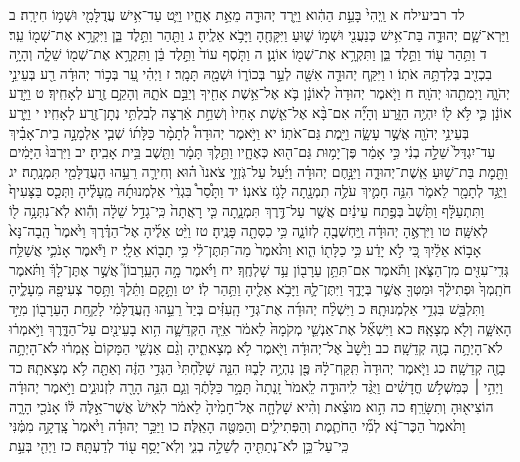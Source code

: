 \documentclass[twoside, openany, parskip=half, 11pt]{book}
\begin{document}
לד רביעילח א וַֽיְהִי֙ בָּעֵ֣ת הַהִ֔וא וַיֵּ֥רֶד יְהוּדָ֖ה מֵאֵ֣ת אֶחָ֑יו וַיֵּ֛ט עַד־אִ֥ישׁ עֲדֻלָּמִ֖י וּשְׁמ֥וֹ חִירָֽה׃ ב וַיַּרְא־שָׁ֧ם יְהוּדָ֛ה בַּת־אִ֥ישׁ כְּנַעֲנִ֖י וּשְׁמ֣וֹ שׁ֑וּעַ וַיִּקָּחֶ֖הָ וַיָּבֹ֥א אֵלֶֽיהָ׃ ג וַתַּ֖הַר וַתֵּ֣לֶד בֵּ֑ן וַיִּקְרָ֥א אֶת־שְׁמ֖וֹ עֵֽר׃ ד וַתַּ֥הַר ע֖וֹד וַתֵּ֣לֶד בֵּ֑ן וַתִּקְרָ֥א אֶת־שְׁמ֖וֹ אוֹנָֽן׃ ה וַתֹּ֤סֶף עוֹד֙ וַתֵּ֣לֶד בֵּ֔ן וַתִּקְרָ֥א אֶת־שְׁמ֖וֹ שֵׁלָ֑ה וְהָיָ֥ה בִכְזִ֖יב בְּלִדְתָּ֥הּ אֹתֽוֹ׃ ו וַיִּקַּ֧ח יְהוּדָ֛ה אִשָּׁ֖ה לְעֵ֣ר בְּכוֹר֑וֹ וּשְׁמָ֖הּ תָּמָֽר׃ ז וַיְהִ֗י עֵ֚ר בְּכ֣וֹר יְהוּדָ֔ה רַ֖ע בְּעֵינֵ֣י יְהֹוָ֑ה וַיְמִתֵ֖הוּ יְהֹוָֽה׃ ח וַיֹּ֤אמֶר יְהוּדָה֙ לְאוֹנָ֔ן בֹּ֛א אֶל־אֵ֥שֶׁת אָחִ֖יךָ וְיַבֵּ֣ם אֹתָ֑הּ וְהָקֵ֥ם זֶ֖רַע לְאָחִֽיךָ׃ ט וַיֵּ֣דַע אוֹנָ֔ן כִּ֛י לֹּ֥א ל֖וֹ יִהְיֶ֣ה הַזָּ֑רַע וְהָיָ֞ה אִם־בָּ֨א אֶל־אֵ֤שֶׁת אָחִיו֙ וְשִׁחֵ֣ת אַ֔רְצָה לְבִלְתִּ֥י נְתׇן־זֶ֖רַע לְאָחִֽיו׃ י וַיֵּ֛רַע בְּעֵינֵ֥י יְהֹוָ֖ה אֲשֶׁ֣ר עָשָׂ֑ה וַיָּ֖מֶת גַּם־אֹתֽוֹ׃ יא וַיֹּ֣אמֶר יְהוּדָה֩ לְתָמָ֨ר כַּלָּת֜וֹ שְׁבִ֧י אַלְמָנָ֣ה בֵית־אָבִ֗יךְ עַד־יִגְדַּל֙ שֵׁלָ֣ה בְנִ֔י כִּ֣י אָמַ֔ר פֶּן־יָמ֥וּת גַּם־ה֖וּא כְּאֶחָ֑יו וַתֵּ֣לֶךְ תָּמָ֔ר וַתֵּ֖שֶׁב בֵּ֥ית אָבִֽיהָ׃ יב וַיִּרְבּוּ֙ הַיָּמִ֔ים וַתָּ֖מׇת בַּת־שׁ֣וּעַ אֵֽשֶׁת־יְהוּדָ֑ה וַיִּנָּ֣חֶם יְהוּדָ֗ה וַיַּ֜עַל עַל־גֹּֽזְזֵ֤י צֹאנוֹ֙ ה֗וּא וְחִירָ֛ה רֵעֵ֥הוּ הָעֲדֻלָּמִ֖י תִּמְנָֽתָה׃ יג וַיֻּגַּ֥ד לְתָמָ֖ר לֵאמֹ֑ר הִנֵּ֥ה חָמִ֛יךְ עֹלֶ֥ה תִמְנָ֖תָה לָגֹ֥ז צֹאנֽוֹ׃ יד וַתָּ֩סַר֩ בִּגְדֵ֨י אַלְמְנוּתָ֜הּ מֵֽעָלֶ֗יהָ וַתְּכַ֤ס בַּצָּעִיף֙ וַתִּתְעַלָּ֔ף וַתֵּ֙שֶׁב֙ בְּפֶ֣תַח עֵינַ֔יִם אֲשֶׁ֖ר עַל־דֶּ֣רֶךְ תִּמְנָ֑תָה כִּ֤י רָאֲתָה֙ כִּֽי־גָדַ֣ל שֵׁלָ֔ה וְהִ֕וא לֹֽא־נִתְּנָ֥ה ל֖וֹ לְאִשָּֽׁה׃ טו וַיִּרְאֶ֣הָ יְהוּדָ֔ה וַֽיַּחְשְׁבֶ֖הָ לְזוֹנָ֑ה כִּ֥י כִסְּתָ֖ה פָּנֶֽיהָ׃ טז וַיֵּ֨ט אֵלֶ֜יהָ אֶל־הַדֶּ֗רֶךְ וַיֹּ֙אמֶר֙ הָֽבָה־נָּא֙ אָב֣וֹא אֵלַ֔יִךְ כִּ֚י לֹ֣א יָדַ֔ע כִּ֥י כַלָּת֖וֹ הִ֑וא וַתֹּ֙אמֶר֙ מַה־תִּתֶּן־לִ֔י כִּ֥י תָב֖וֹא אֵלָֽי׃ יז וַיֹּ֕אמֶר אָנֹכִ֛י אֲשַׁלַּ֥ח גְּדִֽי־עִזִּ֖ים מִן־הַצֹּ֑אן וַתֹּ֕אמֶר אִם־תִּתֵּ֥ן עֵרָב֖וֹן עַ֥ד שָׁלְחֶֽךָ׃ יח וַיֹּ֗אמֶר מָ֣ה הָעֵֽרָבוֹן֮ אֲשֶׁ֣ר אֶתֶּן־לָךְ֒ וַתֹּ֗אמֶר חֹתָֽמְךָ֙ וּפְתִילֶ֔ךָ וּמַטְּךָ֖ אֲשֶׁ֣ר בְּיָדֶ֑ךָ וַיִּתֶּן־לָ֛הּ וַיָּבֹ֥א אֵלֶ֖יהָ וַתַּ֥הַר לֽוֹ׃ יט וַתָּ֣קׇם וַתֵּ֔לֶךְ וַתָּ֥סַר צְעִיפָ֖הּ מֵעָלֶ֑יהָ וַתִּלְבַּ֖שׁ בִּגְדֵ֥י אַלְמְנוּתָֽהּ׃ כ וַיִּשְׁלַ֨ח יְהוּדָ֜ה אֶת־גְּדִ֣י הָֽעִזִּ֗ים בְּיַד֙ רֵעֵ֣הוּ הָֽעֲדֻלָּמִ֔י לָקַ֥חַת הָעֵרָב֖וֹן מִיַּ֣ד הָאִשָּׁ֑ה וְלֹ֖א מְצָאָֽהּ׃ כא וַיִּשְׁאַ֞ל אֶת־אַנְשֵׁ֤י מְקֹמָהּ֙ לֵאמֹ֔ר אַיֵּ֧ה הַקְּדֵשָׁ֛ה הִ֥וא בָעֵינַ֖יִם עַל־הַדָּ֑רֶךְ וַיֹּ֣אמְר֔וּ לֹא־הָיְתָ֥ה בָזֶ֖ה קְדֵשָֽׁה׃ כב וַיָּ֙שׇׁב֙ אֶל־יְהוּדָ֔ה וַיֹּ֖אמֶר לֹ֣א מְצָאתִ֑יהָ וְגַ֨ם אַנְשֵׁ֤י הַמָּקוֹם֙ אָֽמְר֔וּ לֹא־הָיְתָ֥ה בָזֶ֖ה קְדֵשָֽׁה׃ כג וַיֹּ֤אמֶר יְהוּדָה֙ תִּֽקַּֽח־לָ֔הּ פֶּ֖ן נִהְיֶ֣ה לָב֑וּז הִנֵּ֤ה שָׁלַ֙חְתִּי֙ הַגְּדִ֣י הַזֶּ֔ה וְאַתָּ֖ה לֹ֥א מְצָאתָֽהּ׃ כד וַיְהִ֣י ׀ כְּמִשְׁלֹ֣שׁ חֳדָשִׁ֗ים וַיֻּגַּ֨ד לִֽיהוּדָ֤ה לֵֽאמֹר֙ זָֽנְתָה֙ תָּמָ֣ר כַּלָּתֶ֔ךָ וְגַ֛ם הִנֵּ֥ה הָרָ֖ה לִזְנוּנִ֑ים וַיֹּ֣אמֶר יְהוּדָ֔ה הוֹצִיא֖וּהָ וְתִשָּׂרֵֽף׃ כה הִ֣וא מוּצֵ֗את וְהִ֨יא שָׁלְחָ֤ה אֶל־חָמִ֙יהָ֙ לֵאמֹ֔ר לְאִישׁ֙ אֲשֶׁר־אֵ֣לֶּה לּ֔וֹ אָנֹכִ֖י הָרָ֑ה וַתֹּ֙אמֶר֙ הַכֶּר־נָ֔א לְמִ֞י הַחֹתֶ֧מֶת וְהַפְּתִילִ֛ים וְהַמַּטֶּ֖ה הָאֵֽלֶּה׃ כו וַיַּכֵּ֣ר יְהוּדָ֗ה וַיֹּ֙אמֶר֙ צָֽדְקָ֣ה מִמֶּ֔נִּי כִּֽי־עַל־כֵּ֥ן לֹא־נְתַתִּ֖יהָ לְשֵׁלָ֣ה בְנִ֑י וְלֹֽא־יָסַ֥ף ע֖וֹד לְדַעְתָּֽהּ׃ כז וַיְהִ֖י בְּעֵ֣ת 
\end{document}
